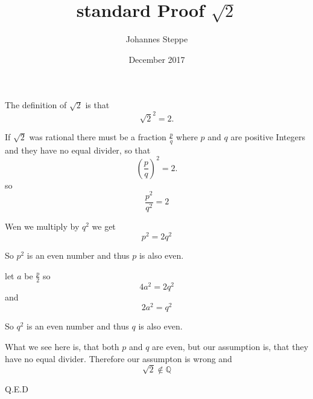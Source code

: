 \documentclass{article}
\title{standard Proof $\sqrt{2}$}
\author{Johannes Steppe}
\date{December 2017}
\begin{document}
\maketitle

The definition of $\sqrt{2}$ is that 
\[\sqrt{2}^2=2.\]

If $\sqrt{2}$ was rational there must be a fraction $\frac{p}{q}$ where $p$ and $q$ are positive Integers and they have no equal divider, so that 
\[\left(\frac{p}{q}\right)^2=2.\]
so
\[\frac{p^2}{q^2}=2\]


Wen we multiply by $q^2$ we get
\[p^2=2q^2\]

So $p^2$ is an even number and thus $p$ is also even.

let $a$ be $\frac{p}{2}$ so
\[4a^2=2q^2\]
and
\[2a^2=q^2\]

So $q^2$ is an even number and thus $q$ is also even.

What we see here is, that both $p$ and $q$ are even, but our assumption is, that they have no equal divider.
Therefore our assumpton is wrong and 
\[\sqrt{2}\notin \mathbb{Q} \]

Q.E.D
\end{document}
